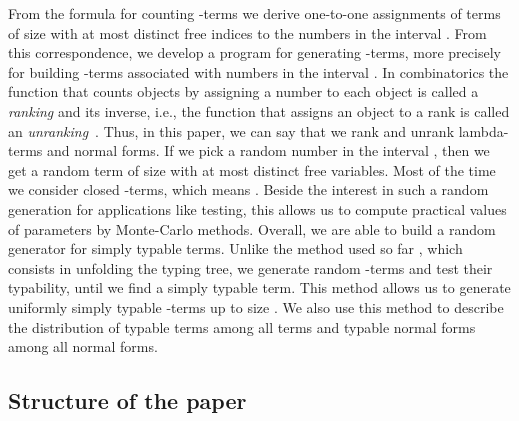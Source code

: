 \documentclass{jfp1}
\begin{document}
From the formula for counting -terms we derive one-to-one assignments of terms of
size  with at most  distinct free indices to the numbers in the interval
.  From this correspondence, we develop a program for generating
-terms, more precisely for building -terms associated with numbers in the
interval .  In combinatorics the function that counts objects by
assigning a number to each object is called a \emph{ranking} and its inverse, i.e.,
the function that assigns an object to a rank is called an
\emph{unranking}~\cite{integer:ranking}.  Thus, in this paper, we can say that we rank and unrank
lambda-terms and normal forms.  If we pick a random number in the interval
, then we get a random term of size  with at most  distinct free
variables.  Most of the time we consider closed -terms, which means .
Beside the interest in such a random generation for applications like testing, this
allows us to compute practical values of parameters by Monte-Carlo methods.  Overall,
we are able to build a random generator for simply typable terms. Unlike the method
used so far \cite{Palka:2011:TOC:1982595.1982615}, which consists in unfolding the
typing tree, we generate random \mbox{-terms} and test their typability, until we
find a simply typable term.  This method allows us to generate uniformly simply
typable -terms up to size .  We also use this method to describe the
distribution of typable terms among all terms and typable normal forms among all
normal forms.


\subsection*{Structure of the paper}
\label{sec:structure-ther-paper}
\end{document}
